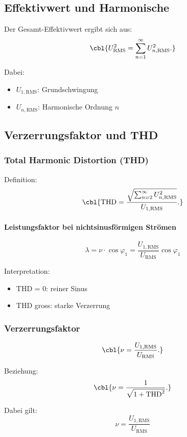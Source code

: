 \subsection{Effektivwert und Harmonische}

Der Gesamt-Effektivwert ergibt sich aus:
\[
\cbl{U_{\mathrm{RMS}}^2 = \sum_{n=1}^{\infty} U_{n,\mathrm{RMS}}^2.}
\]

Dabei:
\begin{itemize}
    \item $U_{1,\mathrm{RMS}}$: Grundschwingung
    \item $U_{n,\mathrm{RMS}}$: Harmonische Ordnung $n$
\end{itemize}

\subsection{Verzerrungsfaktor und THD}

\subsubsection{Total Harmonic Distortion (THD)}

Definition:
\[
\cbl{\mathrm{THD} =
\frac{\sqrt{ \sum_{n=2}^{\infty} U_{n,\mathrm{RMS}}^2 }}{U_{1,\mathrm{RMS}}}.}
\]

\paragraph{Leistungsfaktor bei nichtsinusförmigen Strömen}
\[
\lambda = \nu \cdot \cos\varphi_1 = \frac{U_{1,\mathrm{RMS}}}{U_{\mathrm{RMS}}} \cos\varphi_1
\]


Interpretation:
\begin{itemize}
    \item THD = 0: reiner Sinus
    \item THD gross: starke Verzerrung
\end{itemize}

\subsubsection{Verzerrungsfaktor}

\[
\cbl{\nu = \frac{U_{1,\mathrm{RMS}}}{U_{\mathrm{RMS}}}.}
\]

Beziehung:
\[
\cbl{\nu = \frac{1}{\sqrt{1 + \mathrm{THD}^2}}.}
\]

Dabei gilt:
\[
\nu = \frac{U_{1,\mathrm{RMS}}}{U_{\mathrm{RMS}}}
\]



